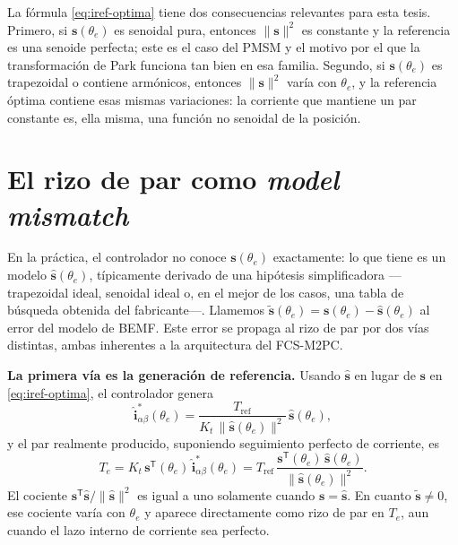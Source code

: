 \documentclass[../../../Tesis_JALS_Maestria.tex]{subfiles}
\begin{document}
La fórmula \eqref{eq:iref-optima} tiene dos consecuencias relevantes para esta tesis. Primero, si $\mathbf{s}(\theta_e)$ es senoidal pura, entonces $\|\mathbf{s}\|^2$ es constante y la referencia es una senoide perfecta; este es el caso del PMSM y el motivo por el que la transformación de Park funciona tan bien en esa familia. Segundo, si $\mathbf{s}(\theta_e)$ es trapezoidal o contiene armónicos, entonces $\|\mathbf{s}\|^2$ varía con $\theta_e$, y la referencia óptima contiene esas mismas variaciones: la corriente que mantiene un par constante es, ella misma, una función no senoidal de la posición.

\section{El rizo de par como \textit{model mismatch}}
\label{sec:rizo-mismatch}

En la práctica, el controlador no conoce $\mathbf{s}(\theta_e)$ exactamente: lo que tiene es un modelo $\hat{\mathbf{s}}(\theta_e)$, típicamente derivado de una hipótesis simplificadora ---trapezoidal ideal, senoidal ideal o, en el mejor de los casos, una tabla de búsqueda obtenida del fabricante---. Llamemos $\tilde{\mathbf{s}}(\theta_e) = \mathbf{s}(\theta_e) - \hat{\mathbf{s}}(\theta_e)$ al error del modelo de BEMF. Este error se propaga al rizo de par por dos vías distintas, ambas inherentes a la arquitectura del FCS-M2PC.

\textbf{La primera vía es la generación de referencia.} Usando $\hat{\mathbf{s}}$ en lugar de $\mathbf{s}$ en \eqref{eq:iref-optima}, el controlador genera
\begin{equation}
    \hat{\mathbf{i}}_{\alpha\beta}^*(\theta_e) = \frac{T_\mathrm{ref}}{K_t\,\|\hat{\mathbf{s}}(\theta_e)\|^2}\,\hat{\mathbf{s}}(\theta_e),
    \label{eq:iref-incorrecta}
\end{equation}
y el par realmente producido, suponiendo seguimiento perfecto de corriente, es
\begin{equation}
    T_e = K_t\,\mathbf{s}^{\mathsf T}(\theta_e)\,\hat{\mathbf{i}}_{\alpha\beta}^*(\theta_e) = T_\mathrm{ref}\,\frac{\mathbf{s}^{\mathsf T}(\theta_e)\,\hat{\mathbf{s}}(\theta_e)}{\|\hat{\mathbf{s}}(\theta_e)\|^2}.
    \label{eq:torque-incorrecto}
\end{equation}
El cociente $\mathbf{s}^{\mathsf T}\hat{\mathbf{s}}/\|\hat{\mathbf{s}}\|^2$ es igual a uno solamente cuando $\mathbf{s} = \hat{\mathbf{s}}$. En cuanto $\tilde{\mathbf{s}} \neq 0$, ese cociente varía con $\theta_e$ y aparece directamente como rizo de par en $T_e$, aun cuando el lazo interno de corriente sea perfecto.
\end{document}
